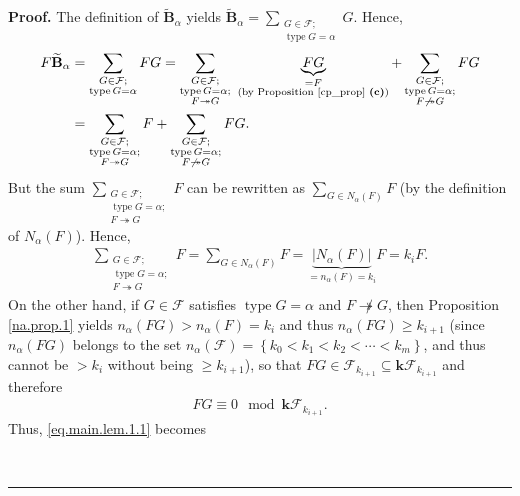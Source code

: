\documentclass[12pt]{article}
\theoremstyle{definition}%
\theoremstyle{definition}%
\theoremstyle{remark}%
\newcommand{\tup}[1]{\left( #1 \right)}
\newcommand{\set}[1]{\left\{ #1 \right\}}
\newcommand{\card}[1]{\left| #1 \right|} %
\newcommand{\kk}{\mathbf{k}}
\newcommand{\kf}{\kk\mathcal{F}}
\newcommand{\BBta}{\widetilde{\mathbf{B}}_{\alpha}}
\newcommand{\CF}{\mathcal{F}}
\newcommand{\na}{n_{ \alpha } }%
\newcommand{\Na}{N_{ \alpha } }%
\newcommand{\type}{\operatorname{type}}
\newcommand{\con}{\twoheadrightarrow} %
\newenvironment{proof}[1][Proof]{\noindent\textbf{#1.} }{\ \rule{0.5em}{0.5em}}
\begin{document}
\begin{proof}
   The definition of $\BBta$ yields $\BBta = \sum_{\substack{G \in \CF; \\ \type G = \alpha}}G$. Hence,
   \begin{align}
       F\BBta
	   &= \sum_{\substack{G \in \CF; \\ \type G = \alpha}} FG
	   = \sum_{\substack{G \in \CF; \\ \type G = \alpha; \\ F \con G}} \,\, \underbrace{FG}_{\substack{=F \\ \text{(by Proposition \ref{cp_prop} \textbf{(c)})}}}
	   + \sum_{\substack{G \in \CF; \\ \type G = \alpha; \\ F \not\con G}} FG
	   \nonumber\\
       &= \sum_{\substack{G \in \CF; \\ \type G = \alpha; \\ F \con G}} F + \sum_{\substack{G \in \CF; \\ \type G = \alpha; \\ F \not\con G}} FG.
	   \label{eq.main.lem.1.1}
   \end{align}
   But the sum $\sum_{\substack{G \in \CF; \\ \type G = \alpha; \\ F \con G}} F$ can be rewritten as $\sum_{G \in \Na\tup{F}} F$ (by the definition of $\Na\tup{F}$).
   Hence,
   \begin{align}
		\sum_{\substack{G \in \CF; \\ \type G = \alpha; \\ F \con G}} F
		= \sum_{G \in \Na\tup{F}} F
		= \underbrace{\card{\Na\tup{F}}}_{=\na\tup{F} = k_i} F
		= k_i F.
		\label{eq.main.lem.1.3}
   \end{align}
   On the other hand, if $G \in \CF$ satisfies $\type G = \alpha$ and $F \not\con G$, then Proposition \ref{na.prop.1} yields $ \na\tup{ FG } > \na\tup{ F } = k_i $ and thus $ \na\tup{ FG } \ge k_{i+1}$ (since $ \na\tup{ FG } $ belongs to the set $ \na\tup{ \CF } = \set{k_0 < k_1 < k_2 < \cdots  < k_m} $, and thus cannot be $> k_i$ without being $\geq k_{i+1}$), so that $FG \in \CF_{k_{i+1}} \subseteq \kf_{k_{i+1}}$ and therefore
   \begin{align}
		FG \equiv 0 \mod \kf_{k_{i+1}}.
	   \label{eq.main.lem.1.2}
   \end{align}
   Thus, \eqref{eq.main.lem.1.1} becomes

\end{proof}
\end{document}
